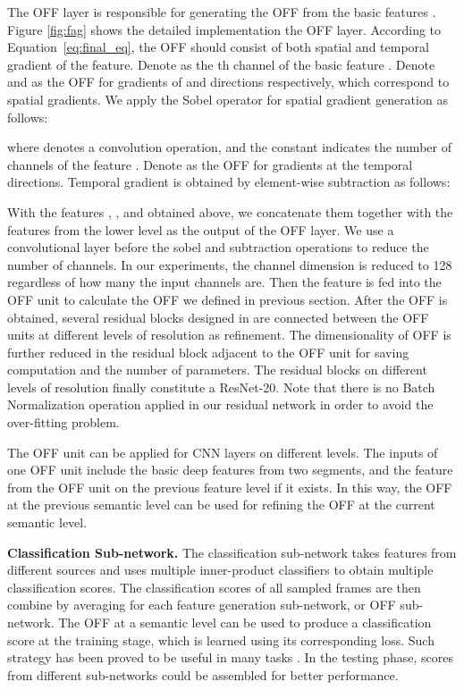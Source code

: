 \documentclass[10pt,twocolumn,letterpaper]{article}
\begin{document}
The OFF layer is responsible for generating the OFF from the basic features . Figure \ref{fig:fag} shows the detailed implementation the OFF layer. According to Equation~\ref{eq:final_eq}, the OFF should consist of both spatial and temporal gradient of the feature. Denote  as the th channel of the basic feature . Denote  and  as the OFF for gradients of  and  directions respectively, which correspond to spatial gradients.
 We apply the Sobel operator for spatial gradient generation as follows:


where  denotes a convolution operation, and the constant  indicates the number of channels of the feature . 
 Denote  as the OFF for gradients at the temporal directions.  Temporal gradient is obtained by element-wise subtraction as follows:


With the features , , and  obtained above, we concatenate them together with the features from the lower level as the output of the OFF layer. We use a  convolutional layer before the sobel and subtraction operations to reduce the number of channels. In our experiments, the channel dimension is reduced to 128 regardless of how many the input channels are. Then the feature is fed into the OFF unit to calculate the OFF we defined in previous section.
After the OFF is obtained, several residual blocks designed in \cite{he2016resnet} are connected between the OFF units at different levels of resolution as refinement. The dimensionality of OFF is further reduced in the residual block adjacent to the OFF unit for saving computation and the number of parameters. The residual blocks on different levels of resolution finally constitute a ResNet-20. Note that there is no Batch Normalization \cite{ioffe2015batchnorm} operation applied in our residual network in order to avoid the over-fitting problem.


The OFF unit can be applied for CNN layers on different levels.
 The inputs of one OFF unit include the basic deep features from two segments, and the feature from the OFF unit on the previous feature level if it exists. In this way, the OFF at the previous semantic level can be used for refining the OFF at the current semantic level.
 
  




 
\textbf{Classification Sub-network.}
The classification sub-network takes features from different sources and uses multiple inner-product classifiers to obtain multiple classification scores. The classification scores of all sampled frames are then combine by averaging for each feature generation sub-network, or OFF sub-network. The OFF at a semantic level can be used to produce a classification score at the training stage, which is learned using its corresponding loss. Such strategy has been proved to be useful in many tasks \cite{Szegedycvpr2015googlenet,wei2016cpm,newell2016hourglass}. In the testing phase, scores from different sub-networks could be assembled for better performance.
\end{document}
